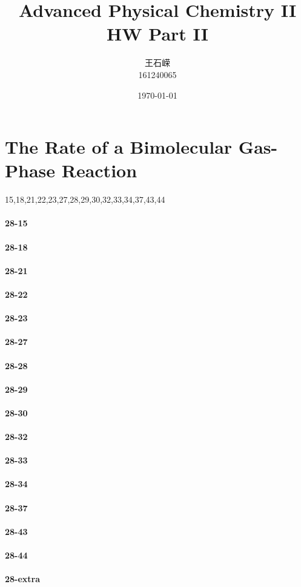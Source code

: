 \documentclass[a4paper]{article}
\title{\textbf{Advanced Physical Chemistry II}\\HW   Part II}
\author{王石嵘
\vspace{5pt}\\
161240065\\
}
\date{\today} %
\newcommand{\ex}[1]{\paragraph{28-#1}}
\numberwithin{equation}{section}
\begin{document}

\maketitle



\setcounter{section}{27}
\section{The Rate of a Bimolecular Gas-Phase Reaction}
15,18,21,22,23,27,28,29,30,32,33,34,37,43,44\\

\ex{15}

\ex{18}


\ex{21}



\ex{22}




\ex{23}




\ex{27}




\ex{28}



\ex{29}


\ex{30}



\ex{32}



\ex{33}



\ex{34}


\ex{37}


\ex{43}



\ex{44}


\ex{extra}
\end{document}

